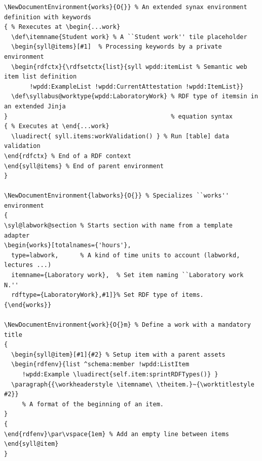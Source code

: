 \documentclass[
]{aiitart}
\begin{document}
\begin{verbatim}
\NewDocumentEnvironment{works}{O{}} % An extended synax environment definition with keywords
{ % Rexecutes at \begin{...work}
  \def\itemname{Student work} % A ``Student work'' tile placeholder
  \begin{syll@items}[#1]  % Processing keywords by a private environment
  \begin{rdfctx}{\rdfsetctx{list}{syll wpdd:itemList % Semantic web item list definition
       !wpdd:ExampleList !wpdd:CurrentAttestation !wpdd:ItemList}}
  \def\syllabus@worktype{wpdd:LaboratoryWork} % RDF type of itemsin in an extended Jinja
}                                             % equation syntax
{ % Executes at \end{...work}
  \luadirect{ syll.items:workValidation() } % Run [table] data validation
\end{rdfctx} % End of a RDF context
\end{syll@items} % End of parent environment
}

\NewDocumentEnvironment{labworks}{O{}} % Specializes ``works'' environment
{
\syl@labwork@section % Starts section with name from a template adapter
\begin{works}[totalnames={'hours'},
  type=labwork,      % A kind of time units to account (labworkd, lectures ...)
  itemname={Laboratory work},  % Set item naming ``Laboratory work N.''
  rdftype={LaboratoryWork},#1]}% Set RDF type of items.
{\end{works}}

\NewDocumentEnvironment{work}{O{}m} % Define a work with a mandatory title
{
  \begin{syll@item}[#1]{#2} % Setup item with a parent assets
  \begin{rdfenv}{list ^schema:member !wpdd:ListItem
     !wpdd:Example \luadirect{self.item:sprintRDFTypes()} }
  \paragraph{{\workheaderstyle \itemname\ \theitem.}~{\worktitlestyle #2}}
     % A format of the beginning of an item.
}
{
\end{rdfenv}\par\vspace{1em} % Add an empty line between items
\end{syll@item}
}
\end{verbatim}
\end{document}
